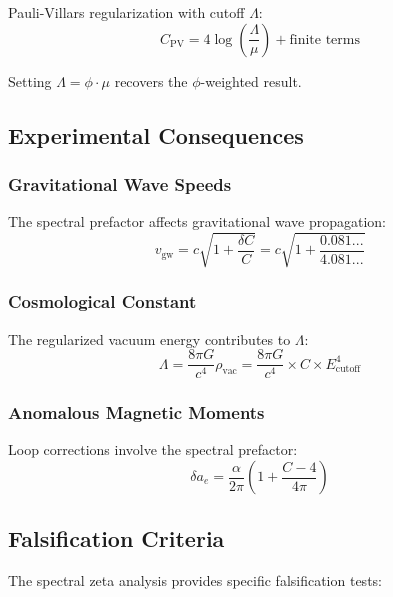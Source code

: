 Pauli-Villars regularization with cutoff $\Lambda$:
\begin{equation}
C_{\text{PV}} = 4 \log\left(\frac{\Lambda}{\mu}\right) + \text{finite terms}
\end{equation}

Setting $\Lambda = \phi \cdot \mu$ recovers the $\phi$-weighted result.

\subsection{Experimental Consequences}

\subsubsection{Gravitational Wave Speeds}

The spectral prefactor affects gravitational wave propagation:
\begin{equation}
v_{\text{gw}} = c \sqrt{1 + \frac{\delta C}{C}} = c \sqrt{1 + \frac{0.081...}{4.081...}}
\end{equation}

\subsubsection{Cosmological Constant}

The regularized vacuum energy contributes to $\Lambda$:
\begin{equation}
\Lambda = \frac{8\pi G}{c^4} \rho_{\text{vac}} = \frac{8\pi G}{c^4} \times C \times E_{\text{cutoff}}^4
\end{equation}

\subsubsection{Anomalous Magnetic Moments}

Loop corrections involve the spectral prefactor:
\begin{equation}
\delta a_e = \frac{\alpha}{2\pi} \left( 1 + \frac{C - 4}{4\pi} \right)
\end{equation}

\subsection{Falsification Criteria}

The spectral zeta analysis provides specific falsification tests:

